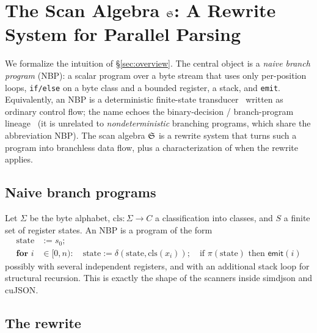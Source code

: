 \section{The Scan Algebra $\mathfrak{S}$: A Rewrite System for Parallel Parsing}
\label{sec:model}

We formalize the intuition of \S\ref{sec:overview}.  The central object is a
\emph{naive branch program} (NBP): a scalar program over a byte stream that uses
only per-position loops, \texttt{if/else} on a byte class and a bounded
register, a stack, and \texttt{emit}.  Equivalently, an NBP is a deterministic
finite-state transducer~\cite{mealy,eilenberg} written as ordinary control flow;
the name echoes the binary-decision / branch-program
lineage~\cite{lee,wegener} (it is unrelated to \emph{nondeterministic}
branching programs, which share the abbreviation NBP).  The scan algebra $\mathfrak{S}$
is a rewrite system that turns such a program into branchless data flow, plus a
characterization of when the rewrite applies.

\subsection{Naive branch programs}
\label{sec:nbp}

Let $\Sigma$ be the byte alphabet, $\mathrm{cls}:\Sigma\to C$ a classification
into classes, and $S$ a finite set of register states.  An NBP is a program of
the form
\begin{align*}
  \text{state} &:= s_0;\\
  \textbf{for } i &\in [0,n):\quad
    \text{state} := \delta(\text{state}, \mathrm{cls}(x_i));\quad
    \text{if } \pi(\text{state}) \text{ then } \mathsf{emit}(i)
\end{align*}
possibly with several independent registers, and with an additional stack loop
for structural recursion.  This is exactly the shape of the scanners inside
\textsf{simdjson} and \textsf{cuJSON}.

\subsection{The rewrite}
\label{sec:rewrite}

